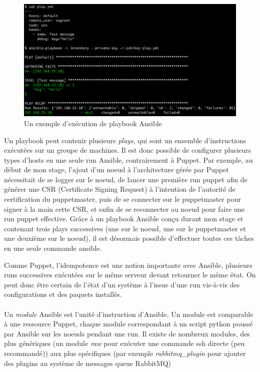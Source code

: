 \documentclass[14 pt]{extreport}
\begin{document}
\begin{figure}[htp]
\centering
\includegraphics[scale=1.10]{play.png}
\caption{Un exemple d'exécution de playbook Ansible}
\label{}
\end{figure}

Un playbook peut contenir plusieurs \emph{plays}, qui sont un ensemble d'instructions exécutées sur un groupe de machines. Il est donc possible de configurer plusieurs types d'hosts en une seule run Ansible, contrairement à Puppet. Par exemple, au début de mon stage, l'ajout d'un noeud à l'architecture gérée par Puppet nécessitait de se logger sur le noeud, de lancer une première run puppet afin de générer une CSR (Certificate Signing Request) à l'intention de l'autorité de certification du puppetmaster, puis de se connecter sur le puppetmaster pour signer à la main cette CSR, et enfin de se reconnecter au noeud pour faire une run puppet effective. Grâce à un playbook Ansible conçu durant mon stage et contenant trois plays successives (une sur le noeud, une sur le puppetmaster et une deuxième sur le noeud), il est désormais possible d'effectuer toutes ces tâches en une seule commande ansible.

Comme Puppet, l'idempotence est une notion importante avec Ansible, plusieurs runs successives exécutées sur le même serveur devant retourner le même état. On peut donc être certain de l'état d'un système à l'issue d'une run vis-à-vis des configurations et des paquets installés.

\paragraph*{}Un \emph{module} Ansible est l'unité d'instruction d'Ansible. Un module est comparable à une ressource Puppet, chaque module correspondant à un script python poussé par Ansible sur les noeuds pendant une run. Il existe de nombreux modules, des plus génériques (un module \emph{raw} pour exécuter une commande ssh directe (peu recommandé)) aux plus spécifiques (par exemple \emph{rabbitmq\_plugin} pour ajouter des plugins au système de messages queue RabbitMQ)
\end{document}
